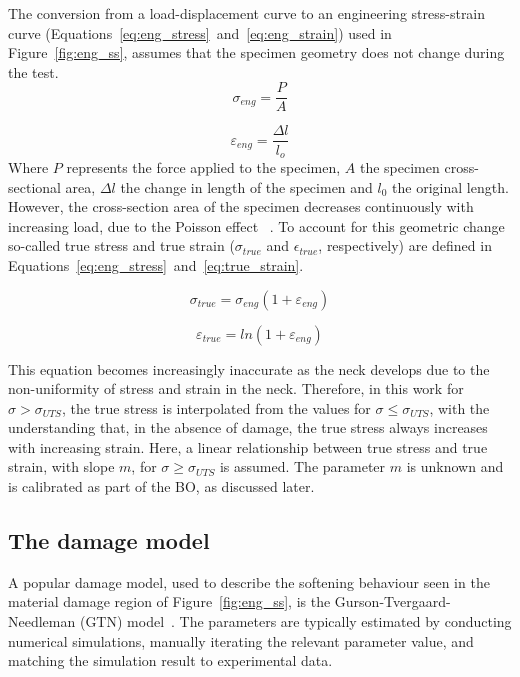 \documentclass[preprint, review, 12pt]{elsarticle}
\begin{document}
	The conversion from a load-displacement curve to an engineering stress-strain curve (Equations~\ref{eq:eng_stress}~and~\ref{eq:eng_strain}) used in Figure~\ref{fig:eng_ss}, assumes that the specimen geometry does not change during the test.
		\begin{equation}
		\sigma_{eng} = \frac{P}{A}
		\label{eq:eng_stress}
	\end{equation}

	\begin{equation}
		\varepsilon_{eng} = \frac{\Delta l}{l_o}
		\label{eq:eng_strain}
	\end{equation}
	Where $P$ represents the force applied to the specimen, $A$ the specimen cross-sectional area, $\Delta l$ the change in length of the specimen and $l_0$ the original length.
	However, the cross-section area of the specimen decreases continuously with increasing load, due to the Poisson effect ~\cite{YOUNG2001}.
	To account for this geometric change so-called true stress and true strain ($\sigma_{true}$ and $\epsilon_{true}$, respectively) are defined in Equations~\ref{eq:eng_stress}~and~\ref{eq:true_strain}.

	\begin{equation}
		\sigma_{true} = \sigma_{eng} \left( 1 + \varepsilon_{eng} \right)
		\label{eq:true_stress}
	\end{equation}

	\begin{equation}
		\varepsilon_{true} = ln\left( 1 + \varepsilon_{eng} \right)
		\label{eq:true_strain}
	\end{equation}

	This equation becomes increasingly inaccurate as the neck develops due to the non-uniformity of stress and strain in the neck.
	Therefore, in this work for $\sigma > \sigma_{UTS}$, the true stress is interpolated from the values for $\sigma \leq \sigma_{UTS}$, with the understanding that, in the absence of damage, the true stress always increases with increasing strain.
	Here, a linear relationship between true stress and true strain, with slope $m$, for $\sigma \ge \sigma_{UTS}$ is assumed.
	The parameter $m$ is unknown and is calibrated as part of the BO, as discussed later.

	\subsection{The damage model}
	\label{h:damage_model}

	A popular damage model, used to describe the softening behaviour seen in the material damage region of Figure~\ref{fig:eng_ss}, is the Gurson-Tvergaard-Needleman (GTN) model~\cite{WCISLIK2016, CHAHBOUB2019, TVERGAARD1984a}.
	The parameters are typically estimated by conducting numerical simulations, manually iterating the relevant parameter value, and matching the simulation result to experimental data.
\end{document}
